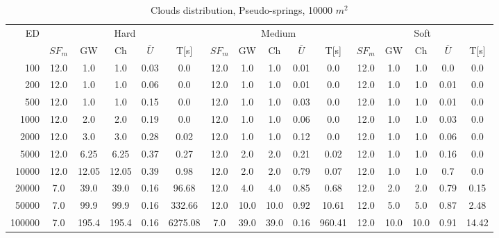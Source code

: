 \begin{table}[htb]
	\centering
	\footnotesize
	\begin{tabular}{|r|c|c|c|c|c|c|c|c|c|c|c|c|c|c|c|} 
		\hline
		\multirow{2}{*}{ED} & \multicolumn{5}{c|}{Hard} & \multicolumn{5}{c|}{Medium} &\multicolumn{5}{c|}{Soft} \\ 
		\cline{2-16} 
		&$SF_{m}$&GW & Ch & $\overline{U}$&T[s] &$SF_{m}$&GW & Ch & $\overline{U}$ &T[s] &$SF_{m}$&GW & Ch & $\overline{U}$  & T[s]  \\ 
		\hline 
		100 & 12.0 & 1.0 & 1.0 & 0.03 & 0.0 & 12.0 & 1.0 & 1.0 & 0.01 & 0.0 & 12.0 & 1.0 & 1.0 & 0.0 & 0.0\\ 
		200 & 12.0 & 1.0 & 1.0 & 0.06 & 0.0 & 12.0 & 1.0 & 1.0 & 0.01 & 0.0 & 12.0 & 1.0 & 1.0 & 0.01 & 0.0\\ 
		500 & 12.0 & 1.0 & 1.0 & 0.15 & 0.0 & 12.0 & 1.0 & 1.0 & 0.03 & 0.0 & 12.0 & 1.0 & 1.0 & 0.01 & 0.0\\ 
		1000 & 12.0 & 2.0 & 2.0 & 0.19 & 0.0 & 12.0 & 1.0 & 1.0 & 0.06 & 0.0 & 12.0 & 1.0 & 1.0 & 0.03 & 0.0\\ 
		2000 & 12.0 & 3.0 & 3.0 & 0.28 & 0.02 & 12.0 & 1.0 & 1.0 & 0.12 & 0.0 & 12.0 & 1.0 & 1.0 & 0.06 & 0.0\\ 
		5000 & 12.0 & 6.25 & 6.25 & 0.37 & 0.27 & 12.0 & 2.0 & 2.0 & 0.21 & 0.02 & 12.0 & 1.0 & 1.0 & 0.16 & 0.0\\ 
		10000 & 12.0 & 12.05 & 12.05 & 0.39 & 0.98 & 12.0 & 2.0 & 2.0 & 0.79 & 0.07 & 12.0 & 1.0 & 1.0 & 0.7 & 0.0\\ 
		20000 & 7.0 & 39.0 & 39.0 & 0.16 & 96.68 & 12.0 & 4.0 & 4.0 & 0.85 & 0.68 & 12.0 & 2.0 & 2.0 & 0.79 & 0.15\\ 
		50000 & 7.0 & 99.9 & 99.9 & 0.16 & 332.66 & 12.0 & 10.0 & 10.0 & 0.92 & 10.61 & 12.0 & 5.0 & 5.0 & 0.87 & 2.48\\ 
		100000 & 7.0 & 195.4 & 195.4 & 0.16 & 6275.08 & 7.0 & 39.0 & 39.0 & 0.16 & 960.41 & 12.0 & 10.0 & 10.0 & 0.91 & 14.42\\ 
		\hline 
	\end{tabular} 
	\caption{Clouds distribution, Pseudo-springs, 10000 $m^2$} 
	\label{tab:UnSprings100} 
\end{table} 
